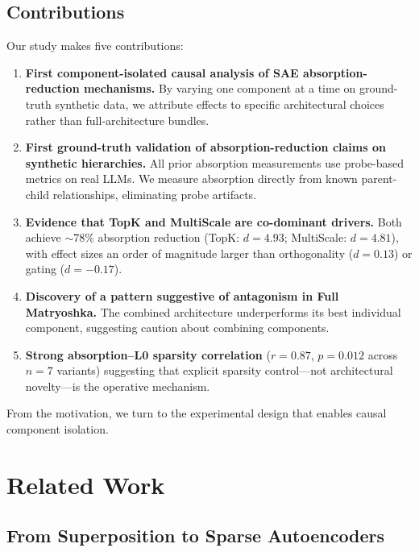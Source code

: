 \documentclass{article}
\begin{document}
\subsection{Contributions}

Our study makes five contributions:

\begin{enumerate}
\item \textbf{First component-isolated causal analysis of SAE absorption-reduction mechanisms.} By varying one component at a time on ground-truth synthetic data, we attribute effects to specific architectural choices rather than full-architecture bundles.

\item \textbf{First ground-truth validation of absorption-reduction claims on synthetic hierarchies.} All prior absorption measurements use probe-based metrics on real LLMs. We measure absorption directly from known parent-child relationships, eliminating probe artifacts.

\item \textbf{Evidence that TopK and MultiScale are co-dominant drivers.} Both achieve $\sim$78\% absorption reduction (TopK: $d = 4.93$; MultiScale: $d = 4.81$), with effect sizes an order of magnitude larger than orthogonality ($d = 0.13$) or gating ($d = -0.17$).

\item \textbf{Discovery of a pattern suggestive of antagonism in Full Matryoshka.} The combined architecture underperforms its best individual component, suggesting caution about combining components.

\item \textbf{Strong absorption--L0 sparsity correlation} ($r = 0.87$, $p = 0.012$ across $n = 7$ variants) suggesting that explicit sparsity control---not architectural novelty---is the operative mechanism.
\end{enumerate}

From the motivation, we turn to the experimental design that enables causal component isolation.

\section{Related Work}

\subsection{From Superposition to Sparse Autoencoders}
\end{document}
